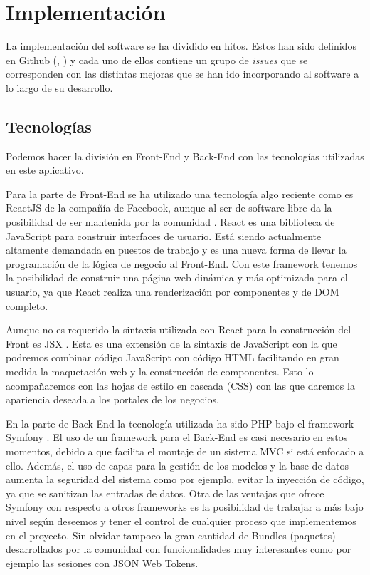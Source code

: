 \chapter{Implementación}

La implementación del software se ha dividido en hitos. Estos han sido definidos en Github (\cite{bappweb}, \cite{bappws})
y cada uno de ellos contiene un grupo de \textit{issues} que se corresponden con las distintas
mejoras que se han ido incorporando al software a lo largo de su desarrollo.\\

\section{Tecnologías}

Podemos hacer la división en Front-End y Back-End con las tecnologías utilizadas en este aplicativo. 

Para la parte de Front-End se ha utilizado una tecnología algo reciente como es ReactJS de la compañía de Facebook, aunque al ser de software libre da la posibilidad de ser mantenida por la comunidad \cite{reactjs}. React es una biblioteca de JavaScript para construir interfaces de usuario. Está siendo actualmente altamente demandada en puestos de trabajo y es una nueva forma de llevar la programación de la lógica de negocio al Front-End. Con este framework tenemos la posibilidad de construir una página web dinámica y más optimizada para el usuario, ya que React realiza una renderización por componentes y de DOM completo. 

Aunque no es requerido la sintaxis utilizada con React para la construcción del Front es JSX \cite{jsx}. Esta es una extensión de la sintaxis de JavaScript con la que podremos combinar código JavaScript con código HTML facilitando en gran medida la maquetación web y la construcción de componentes. Esto lo acompañaremos con las hojas de estilo en cascada (CSS) con las que daremos la apariencia deseada a los portales de los negocios.

En la parte de Back-End la tecnología utilizada ha sido PHP bajo el framework Symfony \cite{symfonyBook}. El uso de un framework para el Back-End es casi necesario en estos momentos, debido a que facilita el montaje de un sistema MVC si está enfocado a ello. Además, el uso de capas para la gestión de los modelos y la base de datos aumenta la seguridad del sistema como por ejemplo, evitar la inyección de código, ya que se sanitizan las entradas de datos. Otra de las ventajas que ofrece Symfony con  respecto a otros frameworks es la posibilidad de trabajar a más bajo nivel según deseemos y tener el control de cualquier proceso que implementemos en el proyecto. Sin olvidar tampoco la gran cantidad de Bundles (paquetes) desarrollados por la comunidad con funcionalidades muy interesantes como por ejemplo las sesiones con JSON Web Tokens.

